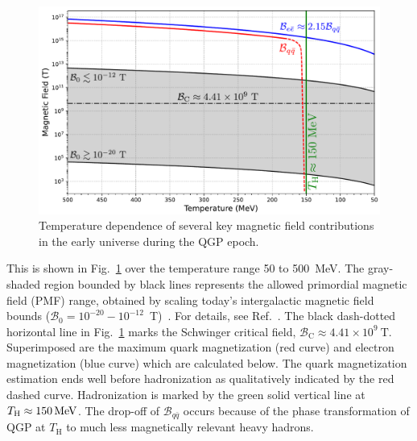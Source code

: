 \documentclass[epjST]{svjour}
\newcommand*{\MeV}{\text{\,MeV}}
\begin{document}
\begin{figure}%
\centerline{
\includegraphics[width=0.90\columnwidth]{python/Figure_1.pdf}}
\caption{\label{Figure_1}Temperature dependence of several key magnetic field contributions in the early universe during the QGP epoch.}
\end{figure}

This is shown in Fig.~\ref{Figure_1} over the temperature range 50 to 500~MeV. The gray-shaded region bounded by black lines represents the allowed primordial magnetic field (PMF) range, obtained by scaling today’s intergalactic magnetic field bounds (\(\mathcal{B}_{0} = 10^{-20}-10^{-12}\)~T)~\cite{Planck:2015zrl,Jedamzik:2018itu}. For details, see Ref.~\cite{Steinmetz:2023nsc}. The black dash-dotted horizontal line in Fig.~\ref{Figure_1} marks the Schwinger critical field, \(\mathcal{B}_\mathrm{C}\approx4.41\times10^{9}~\mathrm{T}\). Superimposed are the maximum quark magnetization (red curve) and electron magnetization (blue curve) which are calculated below. The quark magnetization estimation ends well before hadronization as qualitatively indicated by the red dashed curve. Hadronization is marked by the green solid vertical line at \(T_\mathrm{H}\approx150\MeV\). The drop-off of \(\mathcal{B}_{q\bar{q}}\) occurs because of the phase transformation of QGP at \(T_\mathrm{H}\) to much less magnetically relevant heavy hadrons.
\end{document}
